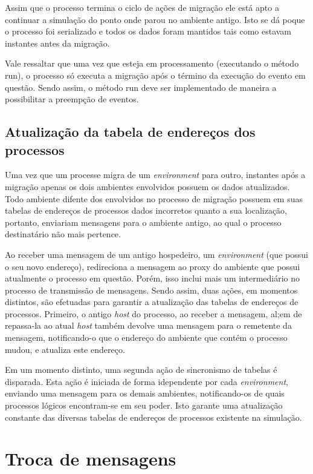 Assim que o processo termina o ciclo de ações de migração ele está apto a continuar a simulação do ponto onde parou no ambiente antigo. Isto se dá poque o processo foi serializado e todos os dados foram mantidos tais como estavam instantes antes da migração.

Vale ressaltar que uma vez que esteja em processamento (executando o método run), o processo só executa a migração após o término da execução do evento em questão. Sendo assim, o método run deve ser implementado de maneira a possibilitar a preempção de eventos.

\subsection{Atualização da tabela de endereços dos processos \label{atualizacao}}

Uma vez que um processe migra de um \textit{environment} para outro, instantes após a migração apenas os dois ambientes envolvidos possuem os dados atualizados. Todo ambiente difente dos envolvidos no processo de migração possuem em suas tabelas de endereços de processos dados incorretos quanto a sua localização, portanto, enviariam mensagens para o ambiente antigo, ao qual o processo destinatário não mais pertence.

Ao receber uma mensagem de um antigo hospedeiro, um \textit{environment} (que possui o seu novo endereço), redireciona a mensagem ao proxy do ambiente que possui atualmente o processo em questão. Porém, isso inclui mais um intermediário no processo de transmissão de mensagens. Sendo assim, duas ações, em momentos distintos, são efetuadas para garantir a atualização das tabelas de endereços de processos. Primeiro, o antigo \textit{host} do processo, ao receber a mensagem, al;em de repassa-la ao atual \textit{host} também devolve uma mensagem para o remetente da mensagem, notificando-o que o endereço do ambiente que contém o processo mudou, e atualiza este endereço.

Em um momento distinto, uma segunda ação de sincronismo de tabelas é disparada. Esta ação é iniciada de forma idependente por cada \textit{environment}, enviando uma mensagem para os demais ambientes, notificando-os de quais processos lógicos encontram-se em seu poder. Isto garante uma atualização constante das diversas tabelas de endereços de processos existente na simulação.

\section{Troca de mensagens \label{troca_mensagens}}

